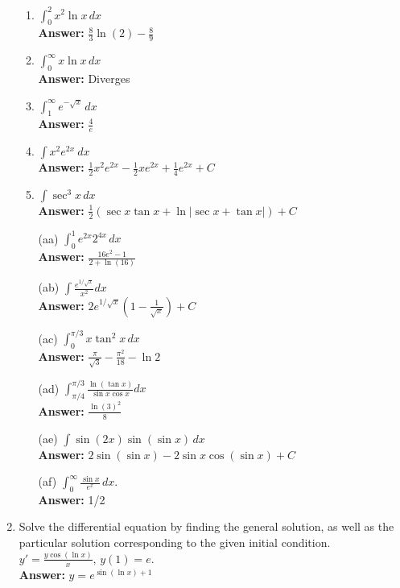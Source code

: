 \documentclass[letterpaper]{article}
\begin{document}
\begin{enumerate}
\begin{enumerate}
	\item $\int_0^2 x^2 \ln x\,dx$
	\\ \textbf{Answer:} $\frac{8}{3}\ln(2)-\frac{8}{9}$

	\item $\int_0^\infty x\ln x\,dx$
	\\ \textbf{Answer:} Diverges

	\item $\int_1^\infty e^{-\sqrt x}\,dx$
	\\ \textbf{Answer:} $\frac{4}{e}$

	\item $\int x^2 e^{2x}~dx$
	\\ \textbf{Answer:} $\frac12 x^2 e^{2x}- \frac12xe^{2x}+\frac14e^{2x}+C$

	\item $\int \sec^3 x\,dx$
	\\ \textbf{Answer:} $\frac{1}{2}\left(\sec x \tan x + \ln | \sec x + \tan x| \right)+C$

	\item[(aa)] $\int_0^1 e^{2x}2^{4x}\,dx$
	\\ \textbf{Answer:} $\frac{16e^2-1}{2+\ln(16)}$

	\item[(ab)] $\int \frac{e^{1/\sqrt{x}}}{x^2}dx$
	\\ \textbf{Answer:} $2e^{1/\sqrt{x}}\left(1-\frac{1}{\sqrt x}\right)+C$

	\item[(ac)] $\int_0^{\pi/3} x\tan^2 x\,dx$
	\\ \textbf{Answer:} $\frac{\pi}{\sqrt{3}}-\frac{\pi^2}{18}-\ln 2$

	\item[(ad)] $\int_{\pi/4}^{\pi/3} \frac{\ln(\tan x)}{\sin x \cos x}dx$
	\\ \textbf{Answer:} $\frac{\ln(3)^2}{8}$

	\item[(ae)] $\int \sin(2x)\sin(\sin x)\,dx$
	\\ \textbf{Answer:} $2\sin(\sin x)-2\sin x\cos(\sin x)+C$

	\item[(af)] $\int_0^\infty \frac{\sin x}{e^x}\,dx$.
	\\ \textbf{Answer:} 1/2
	\end{enumerate}


\item Solve the differential equation by finding the general solution, as well as the particular solution corresponding to the given initial condition.
	$y'=\frac{y\cos (\ln x)}{x},\,y(1)=e$.
	\\ \textbf{Answer:} $y= e^{\sin(\ln x)+1}$

\end{enumerate}
\end{document}
